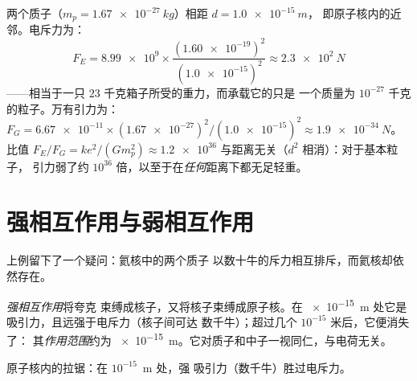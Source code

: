 \begin{example}\label{ex:g11:fundamental-interactions:protons}
两个质子（$m_p = \qty{1.67e-27}{kg}$）相距 $d = \qty{1.0e-15}{m}$，
即原子核内的近邻。电斥力为：
\[
F_E = \num{8.99e9} \times
\frac{(\num{1.60e-19})^{2}}{(\num{1.0e-15})^{2}}
\approx \qty{2.3e2}{N}
\]
——相当于一只 $23$ 千克箱子所受的重力，而承载它的只是
一个质量为 $10^{-27}$ 千克的粒子。万有引力为：
$F_G = \num{6.67e-11} \times (\num{1.67e-27})^{2} /
(\num{1.0e-15})^{2} \approx \qty{1.9e-34}{N}$。比值
$F_E / F_G = k e^{2} / (G m_p^{2}) \approx \num{1.2e36}$
与距离无关（$d^{2}$ 相消）：对于基本粒子，
引力弱了约 $10^{36}$ 倍，以至于在\emph{任何}距离下都无足轻重。
\end{example}

\section{强相互作用与弱相互作用}

上例留下了一个疑问：氦核中的两个质子
以数十牛的斥力相互排斥，而氦核却依然存在。

\begin{definition}[强相互作用]\label{def:g11:fundamental-interactions:strong}
\emph{强相互作用}将夸克
束缚成核子，又将核子束缚成原子核。在 \qty{e-15}{m} 处它是
吸引力，且远强于电斥力（核子间可达
数千牛）；超过几个 $10^{-15}$ 米后，它便消失了：
其\emph{作用范围}约为
\qty{e-15}{m}。它对质子和中子一视同仁，与电荷无关。
\end{definition}

\begin{omfigure}

{\small 原子核内的拉锯：在 $10^{-15}$~m 处，强
吸引力（数千牛）胜过电斥力。}
\end{omfigure}

